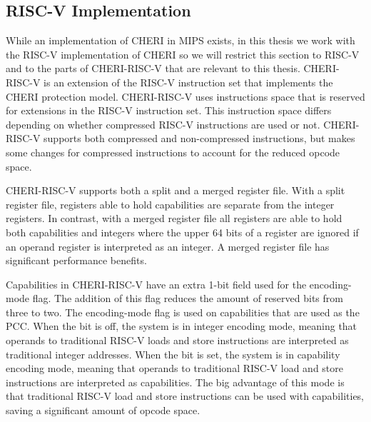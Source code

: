 \subsection{RISC-V Implementation}
While an implementation of CHERI in MIPS exists, in this thesis we work with the RISC-V implementation of CHERI so we will restrict this section to RISC-V and to the parts of CHERI-RISC-V that are relevant to this thesis. CHERI-RISC-V is an extension of the RISC-V instruction set that implements the CHERI protection model. CHERI-RISC-V uses instructions space that is reserved for extensions in the RISC-V instruction set. This instruction space differs depending on whether compressed RISC-V instructions are used or not. CHERI-RISC-V supports both compressed and non-compressed instructions, but makes some changes for compressed instructions to account for the reduced opcode space.

CHERI-RISC-V supports both a split and a merged register file. With a split register file, registers able to hold capabilities are separate from the integer registers. In contrast, with a merged register file all registers are able to hold both capabilities and integers where the upper 64 bits of a register are ignored if an operand register is interpreted as an integer. A merged register file has significant performance benefits.

Capabilities in CHERI-RISC-V have an extra 1-bit field used for the encoding-mode flag. The addition of this flag reduces the amount of reserved bits from three to two. The encoding-mode flag is used on capabilities that are used as the PCC. When the bit is off, the system is in integer encoding mode, meaning that operands to traditional RISC-V loads and store instructions are interpreted as traditional integer addresses. When the bit is set, the system is in capability encoding mode, meaning that operands to traditional RISC-V load and store instructions are interpreted as capabilities. The big advantage of this mode is that traditional RISC-V load and store instructions can be used with capabilities, saving a significant amount of opcode space.
